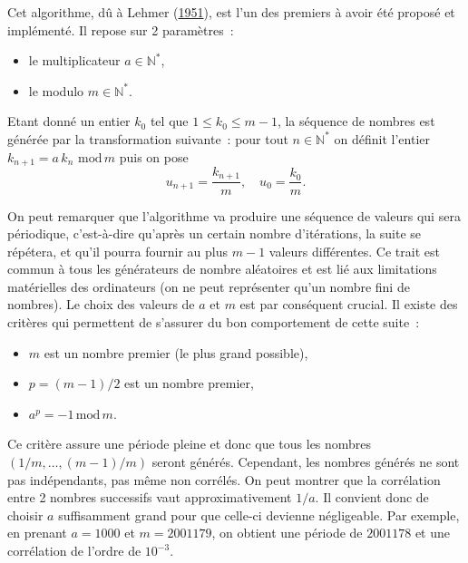 \begin{exemple}\label{V-la-muxe9thode-des-congruences}

Cet algorithme, dû à Lehmer (\protect\hyperlink{refV-Lehmer}{1951}), est
l'un des premiers à avoir été proposé et implémenté. Il repose sur 2
paramètres~:

\begin{itemize}
\tightlist
\item
  le multiplicateur \(a\in\mathbb{N}^\ast\),
\item
  le modulo \(m\in\mathbb{N}^\ast\).
\end{itemize}

Etant donné un entier \(k_0\) tel que \(1 \leq k_0 \leq m-1\), la
séquence de nombres est générée par la transformation suivante~: pour
tout \(n\in\mathbb{N}^\ast\) on définit l'entier
\(k_{n+1} = a\,k_n\,\mathrm{\,mod\,} m\) puis on pose
\[u_{n+1} = \frac{k_{n+1}}{m},\hspace{1em} u_0 = \frac{k_0}{m}.\]

On peut remarquer que l'algorithme va produire une séquence de valeurs
qui sera périodique, c'est-à-dire qu'après un certain nombre
d'itérations, la suite se répétera, et qu'il pourra fournir au plus
\(m-1\) valeurs différentes. Ce trait est commun à tous les générateurs
de nombre aléatoires et est lié aux limitations matérielles des
ordinateurs (on ne peut représenter qu'un nombre fini de nombres). Le
choix des valeurs de \(a\) et \(m\) est par conséquent crucial. Il
existe des critères qui permettent de s'assurer du bon comportement de
cette suite~:

\begin{itemize}
\tightlist
\item
  \(m\) est un nombre premier (le plus grand possible),
\item
  \(p = (m-1) /2\) est un nombre premier,
\item
  \(a^p = -1 \mathrm{\,mod\,} m\).
\end{itemize}

Ce critère assure une période pleine et donc que tous les nombres
\((1/m,\ldots,(m-1)/m)\) seront générés. Cependant, les nombres générés
ne sont pas indépendants, pas même non corrélés. On peut montrer que la
corrélation entre 2 nombres successifs vaut approximativement \(1/a\).
Il convient donc de choisir \(a\) suffisamment grand pour que celle-ci
devienne négligeable. Par exemple, en prenant \(a=1000\) et
\(m=2001179\), on obtient une période de \(2001178\) et une corrélation
de l'ordre de \(10^{-3}\).


\end{exemple}
